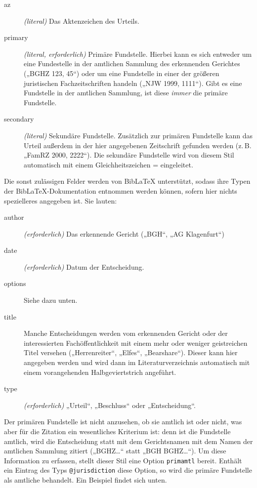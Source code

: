 \documentclass[11pt,a4paper,DIV=calc]{scrartcl}
\newcommand\software[1]{\textsf{#1}}
\newcommand\Biblatex{\software{Bib\LaTeX{}}\xspace}
\newcommand\zB{z.\,B.\xspace}
\begin{document}
\begin{description}
\item[az] \emph{(literal)} Das Aktenzeichen des Urteils.
\item[primary] \emph{(literal, erforderlich)} Primäre
  Fundstelle. Hierbei kann es sich entweder um eine Fundestelle in der
  amtlichen Sammlung des erkennenden Gerichtes („BGHZ 123, 45“) oder
  um eine Fundstelle in einer der größeren juristischen
  Fachzeitschriften handeln („NJW 1999, 1111“). Gibt es eine
  Fundstelle in der amtlichen Sammlung, ist diese \emph{immer} die
  primäre Fundstelle.
\item[secondary] \emph{(literal)} Sekundäre Fundstelle. Zusätzlich zur
  primären Fundstelle kann das Urteil außerdem in der hier angegebenen
  Zeitschrift gefunden werden (\zB „FamRZ 2000, 2222“). Die sekundäre
  Fundstelle wird von diesem Stil automatisch mit einem
  Gleichheitszeichen = eingeleitet.
\end{description}

Die sonst zulässigen Felder werden von \Biblatex unterstützt, sodass
ihre Typen der \Biblatex-Do\-ku\-men\-ta\-tion entnommen werden können, sofern
hier nichts spezielleres angegeben ist. Sie lauten:

\begin{description}
\item[author] \emph{(erforderlich)} Das erkennende Gericht („BGH“, „AG Klagenfurt“)
\item[date] \emph{(erforderlich)} Datum der Entscheidung.
\item[options] Siehe dazu unten.
\item[title] Manche Entscheidungen werden vom erkennenden Gericht oder
  der interessierten Fachöffentlichkeit mit einem mehr oder weniger
  geistreichen Titel versehen („Herrenreiter“, „Elfes“,
  „Bearshare“). Dieser kann hier angegeben werden und wird dann im
  Literaturverzeichnis automatisch mit einem
  vorangehenden Halbgeviertstrich angeführt.
\item[type] \emph{(erforderlich)} „Urteil“, „Beschluss“ oder
  „Entscheidung“.
\end{description}

Der primären Fundstelle ist nicht anzusehen, ob sie amtlich ist oder
nicht, was aber für die Zitation ein wesentliches Kriterium ist: denn
ist die Fundstelle amtlich, wird die Entscheidung statt mit dem
Gerichtsnamen mit dem Namen der amtlichen Sammlung zitiert („BGHZ\ldots“
statt „BGH BGHZ\ldots“). Um diese Information zu erfassen, stellt
dieser Stil eine Option \verb+primamtl+ bereit. Enthält ein Eintrag
des Typs \verb+@jurisdiction+ diese Option, so wird die primäre
Fundstelle als amtliche behandelt. Ein Beispiel findet sich unten.
\end{document}
